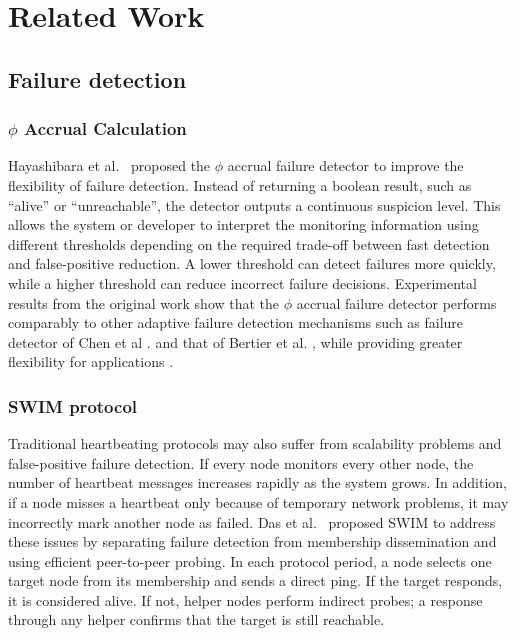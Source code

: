 \section{Related Work}
\label{sec:related_work}
\subsection{Failure detection}

\subsubsection{\texorpdfstring{$\phi$}{phi} Accrual Calculation}

Hayashibara et al.~\cite{hayashibaraAccrualFailureDetector2004} proposed the \texorpdfstring{$\phi$}{phi} accrual
failure detector to improve the flexibility of failure detection. Instead of returning a boolean result, such as
``alive'' or ``unreachable'', the detector outputs a continuous suspicion level. This allows the system or developer to
interpret the monitoring information using different thresholds depending on the required trade-off between fast
detection and false-positive reduction. A lower threshold can detect failures more quickly, while a higher threshold
can reduce incorrect failure decisions. Experimental results from the original work show that the $\phi$ accrual
failure detector performs comparably to other adaptive failure detection mechanisms such as failure detector of Chen et
al \cite{chenQualityServiceFailure}. and that of Bertier et al. \cite{bertierImplementationPerformanceEvaluation2002a},
while providing greater flexibility for applications \cite{hayashibaraAccrualFailureDetector2004}.

\subsubsection{SWIM protocol}

Traditional heartbeating protocols may also suffer from scalability problems and false-positive failure
detection\cite{guptaScalableEfficientDistributed2001}. If every node monitors every other node, the number of heartbeat
messages increases rapidly as the system grows. In addition, if a node misses a heartbeat only because of temporary
network problems, it may incorrectly mark another node as failed. Das et al.~\cite{dasSWIMScalableWeaklyconsistent2002}
proposed SWIM to address these issues by separating failure detection from membership dissemination and using efficient
peer-to-peer probing. In each protocol period, a node selects one target node from its membership and sends a direct
ping. If the target responds, it is considered alive. If not, helper nodes perform indirect probes; a response through
any helper confirms that the target is still reachable.

